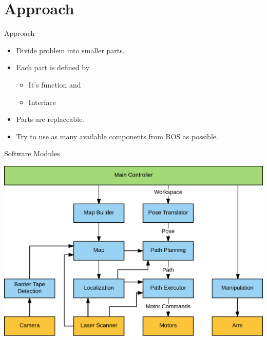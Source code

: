 
\section{Approach}
\begin{frame}{Approach}
    \begin{itemize}
        \item Divide problem into smaller parts.
        \item Each part is defined by
        \begin{itemize}
            \item It's function and
            \item Interface
        \end{itemize}
        \item Parts are replaceable.
        \item Try to use as many available components from ROS as possible.
    \end{itemize}
\end{frame}
\begin{frame}{Software Modules}
    \begin{center}
        \includegraphics[width=\linewidth,height=0.9\textheight,keepaspectratio]{gfx/software_modules.pdf}
    \end{center}
\end{frame}
